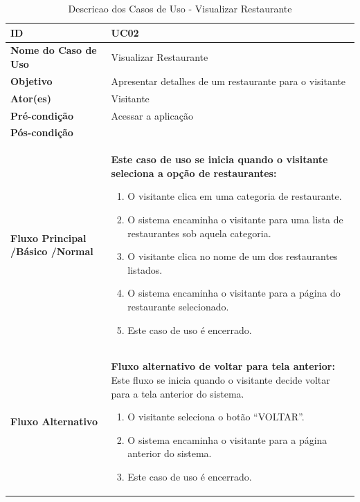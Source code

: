 \begin{table}[t]
\begin{tabular}{| p{6cm} | p{10cm} |}
	\hline
	\textbf{ID} & UC02\tabularnewline
	\hline
	\hline
	\textbf{Nome do Caso de Uso} & Visualizar Restaurante\tabularnewline
	\hline
	\textbf{Objetivo} & Apresentar detalhes de um restaurante para o visitante\tabularnewline
	\hline
	\textbf{Ator(es)} & Visitante\tabularnewline
	\hline
	\textbf{Pré-condição} & Acessar a aplicação\tabularnewline
	\hline
	\textbf{Pós-condição} & \tabularnewline
	\hline
	\textbf{Fluxo Principal /Básico /Normal} & \textbf{Este caso de uso se inicia quando o visitante seleciona a opção de restaurantes:}
	\vspace{0.2cm}
	\begin{enumerate}
		\item O visitante clica em uma categoria de restaurante.
		\item O sistema encaminha o visitante para uma lista de restaurantes sob aquela categoria.
		\item O visitante clica no nome de um dos restaurantes listados.
		\item O sistema encaminha o visitante para a página do restaurante selecionado.
		\item Este caso de uso é encerrado.
	\end{enumerate} \tabularnewline
	\hline
	\textbf{Fluxo Alternativo} & \textbf{Fluxo alternativo de voltar para tela anterior:}
	\vspace{0.2cm}
	Este fluxo se inicia quando o visitante decide voltar para a tela anterior do sistema.
	\begin{enumerate}
		\item O visitante seleciona o botão “VOLTAR”.
		\item O sistema encaminha o visitante para a página anterior do sistema.
		\item Este caso de uso é encerrado.
	\end{enumerate} \tabularnewline
	\hline
\end{tabular}
\caption{Descricao dos Casos de Uso - Visualizar Restaurante}
\label{DCU_Vizualizar_Restaurante}
\end{table}


